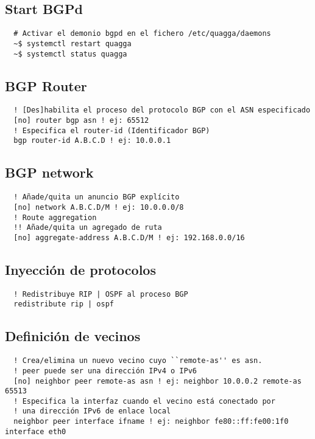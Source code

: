 \documentclass{article}
\begin{document}
\subsection{Start BGPd}
\begin{verbatim}
  # Activar el demonio bgpd en el fichero /etc/quagga/daemons
  ~$ systemctl restart quagga
  ~$ systemctl status quagga
\end{verbatim}

\subsection{BGP Router}
\begin{verbatim}
  ! [Des]habilita el proceso del protocolo BGP con el ASN especificado
  [no] router bgp asn ! ej: 65512
  ! Especifica el router-id (Identificador BGP)
  bgp router-id A.B.C.D ! ej: 10.0.0.1
\end{verbatim}

\subsection{BGP network}
\begin{verbatim}
  ! Añade/quita un anuncio BGP explícito
  [no] network A.B.C.D/M ! ej: 10.0.0.0/8
  ! Route aggregation
  !! Añade/quita un agregado de ruta
  [no] aggregate-address A.B.C.D/M ! ej: 192.168.0.0/16
\end{verbatim}

\subsection{Inyección de protocolos}
\begin{verbatim}
  ! Redistribuye RIP | OSPF al proceso BGP
  redistribute rip | ospf
\end{verbatim}

\subsection{Definición de vecinos}
\begin{verbatim}
  ! Crea/elimina un nuevo vecino cuyo ``remote-as'' es asn.
  ! peer puede ser una dirección IPv4 o IPv6
  [no] neighbor peer remote-as asn ! ej: neighbor 10.0.0.2 remote-as 65513
  ! Especifica la interfaz cuando el vecino está conectado por
  ! una dirección IPv6 de enlace local
  neighbor peer interface ifname ! ej: neighbor fe80::ff:fe00:1f0 interface eth0
\end{verbatim}
\end{document}
